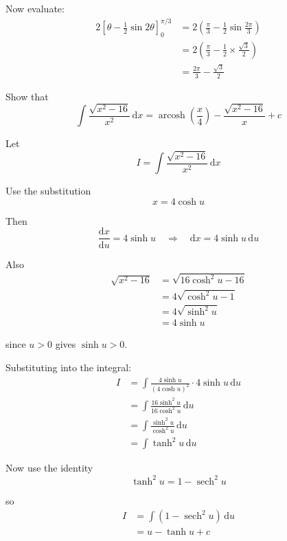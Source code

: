 \documentclass[leqno]{article}
\begin{document}
\begin{enumerate}[
  label=\textbf{\arabic*.},
  leftmargin=*,
  topsep=0pt,
  partopsep=0pt,
  parsep=0pt
]
\begin{djsSolution}
\begin{enumerate}[label=\textbf{(\roman*)}]
Now evaluate:
\begin{align*}
2\left[\theta-\frac12\sin 2\theta\right]_0^{\pi/3}
&=2\left(\frac{\pi}{3}-\frac12\sin\frac{2\pi}{3}\right) \\
&=2\left(\frac{\pi}{3}-\frac12\times\frac{\sqrt3}{2}\right) \\
&=\frac{2\pi}{3}-\frac{\sqrt3}{2}
\end{align*}
\end{enumerate}
\end{djsSolution}


\newpage

\questionitem

Show that
\[
\int \frac{\sqrt{x^2 - 16}}{x^2}\,\mathrm{d}x = \operatorname{arcosh}\left(\frac{x}{4}\right) - \frac{\sqrt{x^2 - 16}}{x} + c
\]

\vspace*{10pt}

\begin{djsSolution}
Let
\[
I=\int \frac{\sqrt{x^2-16}}{x^2}\,\mathrm{d}x
\]

Use the substitution
\[
x=4\cosh u
\]

Then
\[
\frac{\mathrm{d}x}{\mathrm{d}u}=4\sinh u
\quad\Longrightarrow\quad
\mathrm{d}x=4\sinh u\,\mathrm{d}u
\]

Also
\begin{align*}
\sqrt{x^2-16}
&=\sqrt{16\cosh^2u-16} \\
&=4\sqrt{\cosh^2u-1} \\
&=4\sqrt{\sinh^2u} \\
&=4\sinh u
\end{align*}

since $u>0$ gives $\sinh u>0$.

Substituting into the integral:
\begin{align*}
I
&=\int \frac{4\sinh u}{(4\cosh u)^2}\cdot 4\sinh u\,\mathrm{d}u \\
&=\int \frac{16\sinh^2u}{16\cosh^2u}\,\mathrm{d}u \\
&=\int \frac{\sinh^2u}{\cosh^2u}\,\mathrm{d}u \\
&=\int \tanh^2u\,\mathrm{d}u
\end{align*}

Now use the identity
\[
\tanh^2u=1-\operatorname{sech}^2u
\]

so
\begin{align*}
I
&=\int \left(1-\operatorname{sech}^2u\right)\,\mathrm{d}u \\
&=u-\tanh u+c
\end{align*}


\end{djsSolution}
\end{enumerate}
\end{document}
